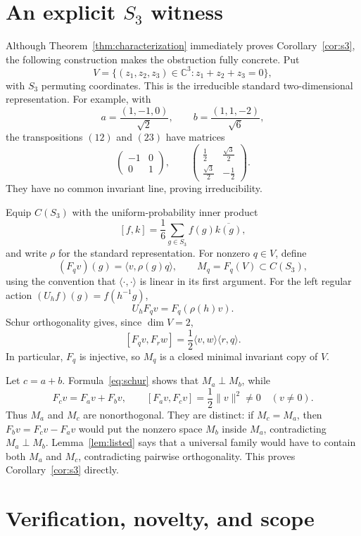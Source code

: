 \documentclass[11pt]{article}
\newcommand{\C}{\mathbb C}
\newcommand{\ip}[2]{\langle #1,#2\rangle}
\begin{document}
\section{An explicit \texorpdfstring{$S_3$}{S3} witness}

Although Theorem~\ref{thm:characterization} immediately proves
Corollary~\ref{cor:s3}, the following construction makes the obstruction
fully concrete.  Put
\[
 V=\{(z_1,z_2,z_3)\in\C^3:z_1+z_2+z_3=0\},
\]
with $S_3$ permuting coordinates.  This is the irreducible standard
two-dimensional representation.  For example, with
\[
 a=\frac{(1,-1,0)}{\sqrt2},\qquad
 b=\frac{(1,1,-2)}{\sqrt6},
\]
the transpositions $(12)$ and $(23)$ have matrices
\[
 \begin{pmatrix}-1&0\\0&1\end{pmatrix},
 \qquad
 \begin{pmatrix}\tfrac12&\tfrac{\sqrt3}{2}\\
                 \tfrac{\sqrt3}{2}&-\tfrac12\end{pmatrix}.
\]
They have no common invariant line, proving irreducibility.

Equip $C(S_3)$ with the uniform-probability inner product
\[
 [f,k]=\frac1{6}\sum_{g\in S_3}f(g)\overline{k(g)},
\]
and write $\rho$ for the standard representation.  For nonzero $q\in V$,
define
\[
 (F_qv)(g)=\ip{v}{\rho(g)q},
 \qquad M_q=F_q(V)\subset C(S_3),
\]
using the convention that $\ip{\cdot}{\cdot}$ is linear in its first
argument.  For the left regular action $(U_hf)(g)=f(h^{-1}g)$,
\[
 U_hF_qv=F_q(\rho(h)v).
\]
Schur orthogonality gives, since $\dim V=2$,
\begin{equation}\label{eq:schur}
 [F_qv,F_rw]=\frac12\ip{v}{w}\ip{r}{q}.
\end{equation}
In particular, $F_q$ is injective, so $M_q$ is a closed minimal invariant
copy of $V$.

Let $c=a+b$.  Formula~\eqref{eq:schur} shows that $M_a\perp M_b$, while
\[
 F_cv=F_av+F_bv,
 \qquad
 [F_av,F_cv]=\frac12\lVert v\rVert^2\neq0
 \quad(v\neq0).
\]
Thus $M_a$ and $M_c$ are nonorthogonal.  They are distinct: if
$M_c=M_a$, then $F_bv=F_cv-F_av$ would put the nonzero space $M_b$ inside
$M_a$, contradicting $M_a\perp M_b$.  Lemma~\ref{lem:listed} says that a
universal family would have to contain both $M_a$ and $M_c$, contradicting
pairwise orthogonality.  This proves Corollary~\ref{cor:s3} directly.

\section{Verification, novelty, and scope}
\end{document}
